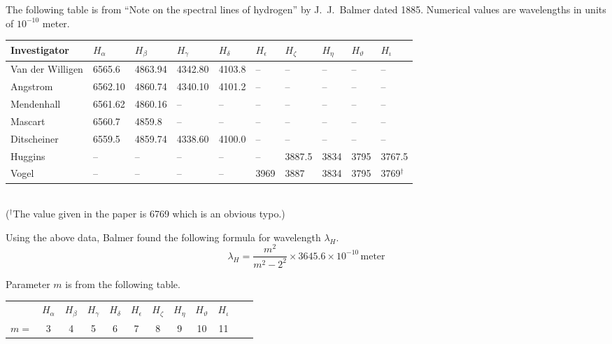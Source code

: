 \documentclass[12pt]{article}
\begin{document}
\noindent
The following table is from
``Note on the spectral lines of hydrogen''
by J.~J.~Balmer dated 1885.
Numerical values are wavelengths in units of $10^{-10}$ meter.
\begin{center}
\footnotesize
\begin{tabular}{|l|l|l|l|l|l|l|l|l|l|}
\hline
Investigator & $H_\alpha$ & $H_\beta$ & $H_\gamma$ & $H_\delta$ & $H_\epsilon$ &
$H_\zeta$ & $H_\eta$ & $H_\vartheta$ & $H_\iota$
\\
\hline
Van der Willigen & 6565.6 & 4863.94 & 4342.80 & 4103.8 & -- & -- & -- & -- & --
\\
Angstrom & 6562.10 & 4860.74 & 4340.10 & 4101.2 & -- & -- & -- & -- & --
\\
Mendenhall & 6561.62 & 4860.16 & -- & -- & -- & -- & -- & -- & --
\\
Mascart & 6560.7 & 4859.8 & -- & -- & -- & -- & -- & -- & --
\\
Ditscheiner & 6559.5 & 4859.74 & 4338.60 & 4100.0 & -- & -- & -- & -- & --
\\
Huggins & -- & -- & -- & -- & -- & 3887.5 & 3834 & 3795 & 3767.5
\\
Vogel & -- & -- & -- & -- & 3969 & 3887 & 3834 & 3795 & 3769${}^\dag$
\\
\hline
\end{tabular}
\\
{\footnotesize(${}^\dag$The value given in the paper is 6769 which is an obvious typo.)}
\end{center}

\noindent
Using the above data, Balmer found the following formula for wavelength $\lambda_H$.
\begin{equation*}
\lambda_H=\frac{m^2}{m^2-2^2}\times3645.6\times10^{-10}\,\text{meter}
\end{equation*}

\noindent
Parameter $m$ is from the following table.
\begin{center}
\begin{tabular}{cccccccccccc}
& $H_\alpha$ & $H_\beta$ & $H_\gamma$ & $H_\delta$ & $H_\epsilon$ &
$H_\zeta$ & $H_\eta$ & $H_\vartheta$ & $H_\iota$
\\
$m=$ & 3 & 4 & 5 & 6 & 7 & 8 & 9 & 10 & 11
\end{tabular}
\end{center}
\end{document}
